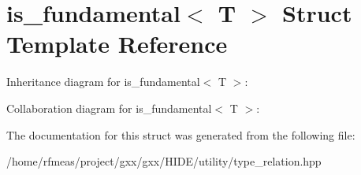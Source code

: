 \hypertarget{structis__fundamental}{}\section{is\+\_\+fundamental$<$ T $>$ Struct Template Reference}
\label{structis__fundamental}


Inheritance diagram for is\+\_\+fundamental$<$ T $>$\+:


Collaboration diagram for is\+\_\+fundamental$<$ T $>$\+:


The documentation for this struct was generated from the following file\+:\begin{DoxyCompactItemize}
\item 
/home/rfmeas/project/gxx/gxx/\+H\+I\+D\+E/utility/type\+\_\+relation.\+hpp\end{DoxyCompactItemize}
